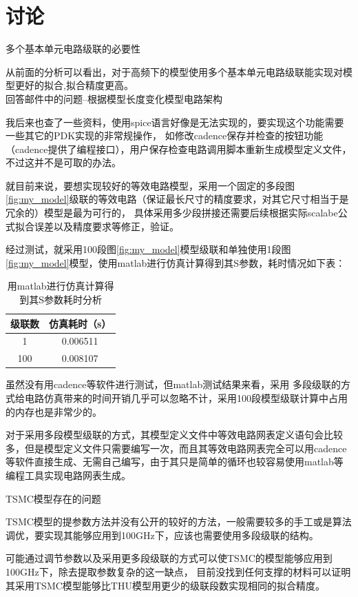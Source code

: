 \documentclass[UTF8,a4paper,zihao=-4]{ctexart}
\begin{document}
\section{讨论}
\noindent
{\heiti 多个基本单元电路级联的必要性}\vspace{0.2 cm}
\par
从前面的分析可以看出，对于高频下的模型使用多个基本单元电路级联能实现对模型更好的拟合,拟合精度更高。\\

\noindent
{\heiti 回答邮件中的问题--根据模型长度变化模型电路架构}\vspace{0.2 cm}
\par
我后来也查了一些资料，使用spice语言好像是无法实现的，要实现这个功能需要一些其它的PDK实现的非常规操作，
如修改cadence保存并检查的按钮功能（cadence提供了编程接口），用户保存检查电路调用脚本重新生成模型定义文件，不过这并不是可取的办法。
\par
就目前来说，要想实现较好的等效电路模型，采用一个固定的多段图\ref{fig:my_model}级联的等效电路（保证最长尺寸的精度要求，对其它尺寸相当于是冗余的）模型是最为可行的，
具体采用多少段拼接还需要后续根据实际scalabe公式拟合误差以及精度要求等修正，验证。
\par
经过测试，就采用100段图\ref{fig:my_model}模型级联和单独使用1段图\ref{fig:my_model}模型，使用matlab进行仿真计算得到其S参数，耗时情况如下表：
\begin{table}[hbt]
\centering
\caption{用matlab进行仿真计算得到其S参数耗时分析}
\label{table:time}
\begin{tabular}{|c|c|}
\hline
级联数 & 仿真耗时（s）  \\ \hline
1   & 0.006511 \\ \hline
100 & 0.008107 \\ \hline
\end{tabular}
\end{table}
虽然没有用cadence等软件进行测试，但matlab测试结果来看，采用
多段级联的方式给电路仿真带来的时间开销几乎可以忽略不计，采用100段模型级联计算中占用的内存也是非常少的。
\par
对于采用多段模型级联的方式，其模型定义文件中等效电路网表定义语句会比较多，但是模型定义文件只需要编写一次，而且其等效电路网表完全可以用cadence等软件直接生成、无需自己编写，由于其只是简单的循环也较容易使用matlab等编程工具实现电路网表生成。


\vspace{0.2 cm}
\noindent
{\heiti TSMC模型存在的问题}\vspace{0.2 cm}
\par
TSMC模型的提参数方法并没有公开的较好的方法，一般需要较多的手工或是算法调优，要实现其能够应用到100GHz下，应该也需要使用多段级联的结构。
\par
可能通过调节参数以及采用更多段级联的方式可以使TSMC的模型能够应用到100GHz下，除去提取参数复杂的这一缺点，
目前没找到任何支撑的材料可以证明其采用TSMC模型能够比THU模型用更少的级联段数实现相同的拟合精度。
\end{document}
